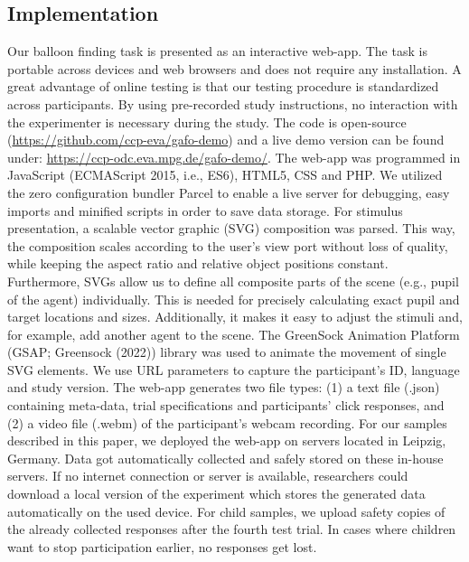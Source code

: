 \documentclass[
  man,floatsintext]{apa6}
\begin{document}
\hypertarget{implementation}{%
\subsection{Implementation}\label{implementation}}

Our balloon finding task is presented as an interactive web-app. The task is portable across devices and web browsers and does not require any installation. A great advantage of online testing is that our testing procedure is standardized across participants. By using pre-recorded study instructions, no interaction with the experimenter is necessary during the study. The code is open-source (\url{https://github.com/ccp-eva/gafo-demo}) and a live demo version can be found under: \url{https://ccp-odc.eva.mpg.de/gafo-demo/}.
The web-app was programmed in JavaScript (ECMAScript 2015, i.e., ES6), HTML5, CSS and PHP.
We utilized the zero configuration bundler Parcel to enable a live server for debugging, easy imports and minified scripts in order to save data storage.
For stimulus presentation, a scalable vector graphic (SVG) composition was parsed. This way, the composition scales according to the user's view port without loss of quality, while keeping the aspect ratio and relative object positions constant.
Furthermore, SVGs allow us to define all composite parts of the scene (e.g., pupil of the agent) individually. This is needed for precisely calculating exact pupil and target locations and sizes. Additionally, it makes it easy to adjust the stimuli and, for example, add another agent to the scene.
The GreenSock Animation Platform (GSAP; Greensock (2022)) library was used to animate the movement of single SVG elements.
We use URL parameters to capture the participant's ID, language and study version.
The web-app generates two file types: (1) a text file (.json) containing meta-data, trial specifications and participants' click responses, and (2) a video file (.webm) of the participant's webcam recording.
For our samples described in this paper, we deployed the web-app on servers located in Leipzig, Germany. Data got automatically collected and safely stored on these in-house servers. If no internet connection or server is available, researchers could download a local version of the experiment which stores the generated data automatically on the used device. For child samples, we upload safety copies of the already collected responses after the fourth test trial. In cases where children want to stop participation earlier, no responses get lost.
\end{document}

